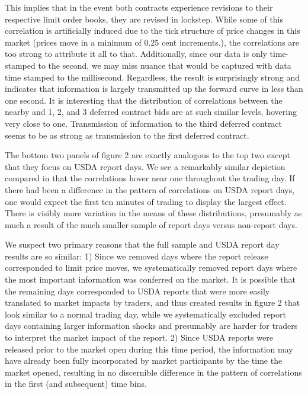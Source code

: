\documentclass[]{elsarticle} %
\begin{document}
This implies that in the event both contracts experience revisions to
their respective limit order books, they are revised in lockstep. While
some of this correlation is artificially induced due to the tick
structure of price changes in this market (prices move in a minimum of
0.25 cent increments.), the correlations are too strong to attribute it
all to that. Additionally, since our data is only time-stamped to the
second, we may miss nuance that would be captured with data time stamped
to the millisecond. Regardless, the result is surprisingly strong and
indicates that information is largely transmitted up the forward curve
in less than one second. It is interesting that the distribution of
correlations between the nearby and 1, 2, and 3 deferred contract bids
are at such similar levels, hovering very close to one. Transmission of
information to the third deferred contract seems to be as strong as
transmission to the first deferred contract.

The bottom two panels of figure 2 are exactly analogous to the top two
except that they focus on USDA report days. We see a remarkably similar
depiction compared in that the correlations hover near one throughout
the trading day. If there had been a difference in the pattern of
correlations on USDA report days, one would expect the first ten minutes
of trading to display the largest effect. There is visibly more
variation in the means of these distributions, presumably as much a
result of the much smaller sample of report days versus non-report days.

We suspect two primary reasons that the full sample and USDA report day
results are so similar: 1) Since we removed days where the report
release corresponded to limit price moves, we systematically removed
report days where the most important information was conferred on the
market. It is possible that the remaining days corresponded to USDA
reports that were more easily translated to market impacts by traders,
and thus created results in figure 2 that look similar to a normal
trading day, while we systematically excluded report days containing
larger information shocks and presumably are harder for traders to
interpret the market impact of the report. 2) Since USDA reports were
released prior to the market open during this time period, the
information may have already been fully incorporated by market
participants by the time the market opened, resulting in no discernible
difference in the pattern of correlations in the first (and subsequent)
time bins.
\end{document}
